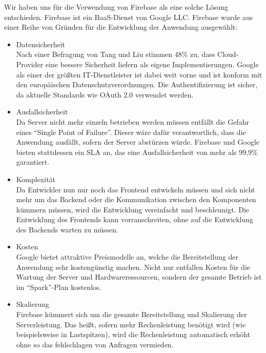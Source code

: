 Wir haben uns für die Verwendung von Firebase als eine solche Lösung entschieden.
Firebase ist ein \ac{BaaS}-Dienst von Google LLC.
Firebase wurde aus einer Reihe von Gründen für die Entwicklung der Anwendung ausgewählt:
\begin{itemize}
    \item Datensicherheit\\
        Nach einer Befragung von Tang und Liu stimmen 48\% zu, dass Cloud-Provider eine bessere Sicherheit liefern als eigene Implementierungen.\autocite[S. 63]{TANG}
        Google als einer der größten IT-Dienstleister ist dabei weit vorne und ist konform mit den europäischen Datenschutzverordnungen.\autocite{firebaseDataprotection}
        Die Authentifizierung ist sicher, da aktuelle Standards wie OAuth 2.0 verwendet werden.
    \item Ausfallsicherheit\\
        Da Server nicht mehr einzeln betrieben werden müssen entfällt die Gefahr eines \enquote{Single Point of Failure}. %
        Dieser wäre dafür verantwortlich, dass die Anwendung ausfällt, sofern der Server abstürzen würde.
        Firebase und Google bieten stattdessen ein \ac{SLA} an, das eine Ausfallsicherheit von mehr als 99,9\% garantiert.\autocite{firebaseSLA}
    \item Komplexität\\
        Da Entwickler nun nur noch das Frontend entwickeln müssen und sich nicht mehr um das Backend oder die Kommunikation zwischen den Komponenten kümmern müssen, wird die Entwicklung vereinfacht und beschleunigt.
        Die Entwicklung des Frontends kann vorranschreiten, ohne auf die Entwicklung des Backends warten zu müssen.
    \item Kosten \\
        Google bietet attraktive Preismodelle an, welche die Bereitstellung der Anwendung sehr kostengünstig machen.
        Nicht nur entfallen Kosten für die Wartung der Server und Hardwareressourcen, sondern der gesamte Betrieb ist im \enquote{Spark}-Plan kostenlos.
    \item Skalierung \\
        Firebase kümmert sich um die gesamte Bereitstellung und Skalierung der Serverleistung.
        Das heißt, sofern mehr Rechenleistung benötigt wird (wie beispielsweise in Lastspitzen), wird die Rechenleistung automatisch erhöht ohne so das fehlschlagen von Anfragen vermieden.
\end{itemize}




















